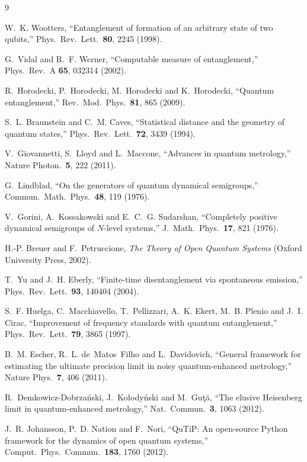 \documentclass[11pt,a4paper]{article}
\begin{document}
\begin{thebibliography}{9}

 W.~K. Wootters, ``Entanglement of formation of an arbitrary state of two qubits,'' Phys.\ Rev.\ Lett.\ \textbf{80}, 2245 (1998).

 G.~Vidal and R.~F. Werner, ``Computable measure of entanglement,'' Phys.\ Rev.\ A \textbf{65}, 032314 (2002).

 R.~Horodecki, P.~Horodecki, M.~Horodecki and K.~Horodecki, ``Quantum entanglement,'' Rev.\ Mod.\ Phys.\ \textbf{81}, 865 (2009).

 S.~L. Braunstein and C.~M. Caves, ``Statistical distance and the geometry of quantum states,'' Phys.\ Rev.\ Lett.\ \textbf{72}, 3439 (1994).

 V.~Giovannetti, S.~Lloyd and L.~Maccone, ``Advances in quantum metrology,'' Nature Photon.\ \textbf{5}, 222 (2011).

 G.~Lindblad, ``On the generators of quantum dynamical semigroups,'' Commun.\ Math.\ Phys.\ \textbf{48}, 119 (1976).

 V.~Gorini, A.~Kossakowski and E.~C.~G. Sudarshan, ``Completely positive dynamical semigroups of $N$-level systems,'' J.\ Math.\ Phys.\ \textbf{17}, 821 (1976).

 H.-P. Breuer and F.~Petruccione, \emph{The Theory of Open Quantum Systems} (Oxford University Press, 2002).

 T.~Yu and J.~H. Eberly, ``Finite-time disentanglement via spontaneous emission,'' Phys.\ Rev.\ Lett.\ \textbf{93}, 140404 (2004).

 S.~F. Huelga, C.~Macchiavello, T.~Pellizzari, A.~K. Ekert, M.~B. Plenio and J.~I. Cirac, ``Improvement of frequency standards with quantum entanglement,'' Phys.\ Rev.\ Lett.\ \textbf{79}, 3865 (1997).

 B.~M. Escher, R.~L. de~Matos~Filho and L.~Davidovich, ``General framework for estimating the ultimate precision limit in noisy quantum-enhanced metrology,'' Nature Phys.\ \textbf{7}, 406 (2011).

 R.~Demkowicz-Dobrza\'nski, J.~Ko\l ody\'nski and M.~Gu\c{t}\u{a}, ``The elusive Heisenberg limit in quantum-enhanced metrology,'' Nat.\ Commun.\ \textbf{3}, 1063 (2012).

 J.~R. Johansson, P.~D. Nation and F.~Nori, ``QuTiP: An open-source Python framework for the dynamics of open quantum systems,'' Comput.\ Phys.\ Commun.\ \textbf{183}, 1760 (2012).

\end{thebibliography}
\end{document}
